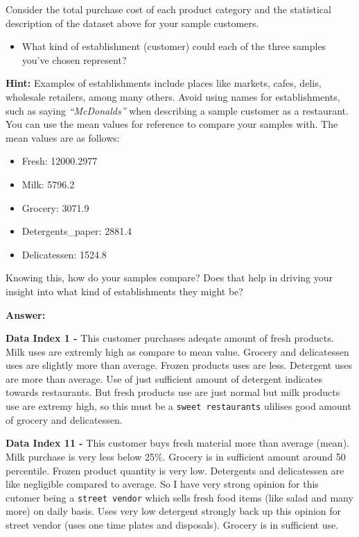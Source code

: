 \documentclass[11pt]{article}
\providecommand{\tightlist}{%
      \setlength{\itemsep}{0pt}\setlength{\parskip}{0pt}}
\begin{document}
Consider the total purchase cost of each product category and the
statistical description of the dataset above for your sample customers.

\begin{itemize}
\tightlist
\item
  What kind of establishment (customer) could each of the three samples
  you've chosen represent?
\end{itemize}

\textbf{Hint:} Examples of establishments include places like markets,
cafes, delis, wholesale retailers, among many others. Avoid using names
for establishments, such as saying \emph{``McDonalds''} when describing
a sample customer as a restaurant. You can use the mean values for
reference to compare your samples with. The mean values are as follows:

\begin{itemize}
\tightlist
\item
  Fresh: 12000.2977
\item
  Milk: 5796.2
\item
  Grocery: 3071.9
\item
  Detergents\_paper: 2881.4
\item
  Delicatessen: 1524.8
\end{itemize}

Knowing this, how do your samples compare? Does that help in driving
your insight into what kind of establishments they might be?

    \textbf{Answer:}

\textbf{Data Index 1 -} This customer purchases adeqate amount of fresh
products. Milk uses are extremly high as compare to mean value. Grocery
and delicatessen uses are slightly more than average. Frozen products
uses are less. Detergent uses are more than average. Use of just
sufficient amount of detergent indicates towards restaurants. But fresh
products use are just normal but milk products use are extremy high, so
this must be a \texttt{sweet\ restaurants} ulilises good amount of
grocery and delicatessen.

\textbf{Data Index 11 -} This customer buys fresh material more than
average (mean). Milk purchase is very less below 25\%. Grocery is in
sufficient amount around 50 percentile. Frozen product quantity is very
low. Detergents and delicatessen are like negligible compared to
average. So I have very strong opinion for this cutomer being a
\texttt{street\ vendor} which sells fresh food items (like salad and
many more) on daily basis. Uses very low detergent strongly back up this
opinion for street vendor (uses one time plates and disposals). Grocery
is in sufficient use.
\end{document}
